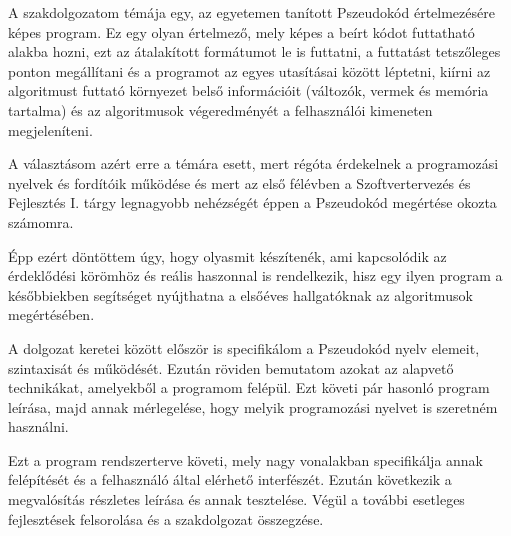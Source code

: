 A szakdolgozatom témája egy, az egyetemen tanított Pszeudokód\cite{jegyzet}\cite{jegyzet2} értelmezésére képes program. Ez egy olyan értelmező, mely képes a beírt kódot futtatható alakba hozni, ezt az átalakított formátumot le is futtatni, a futtatást tetszőleges ponton megállítani és a programot az egyes utasításai között léptetni, kiírni az algoritmust futtató környezet belső információit (változók, vermek és memória tartalma) és az algoritmusok végeredményét a felhasználói kimeneten megjeleníteni.

A választásom azért erre a témára esett, mert régóta érdekelnek a programozási nyelvek és fordítóik működése és mert az első félévben a Szoftvertervezés és Fejlesztés I. tárgy legnagyobb nehézségét éppen a Pszeudokód megértése okozta számomra.

Épp ezért döntöttem úgy, hogy olyasmit készítenék, ami kapcsolódik az érdeklődési körömhöz és reális haszonnal is rendelkezik, hisz egy ilyen program a későbbiekben segítséget nyújthatna a elsőéves hallgatóknak az algoritmusok megértésében.

A dolgozat keretei között először is specifikálom a Pszeudokód nyelv elemeit, szintaxisát és működését. Ezután röviden bemutatom azokat az alapvető technikákat, amelyekből a programom felépül. Ezt követi pár hasonló program leírása, majd annak mérlegelése, hogy melyik programozási nyelvet is szeretném használni.

Ezt a program rendszerterve követi, mely nagy vonalakban specifikálja annak felépítését és a felhasználó által elérhető interfészét. Ezután következik a megvalósítás részletes leírása és annak tesztelése. Végül a további esetleges fejlesztések felsorolása és a szakdolgozat összegzése.
